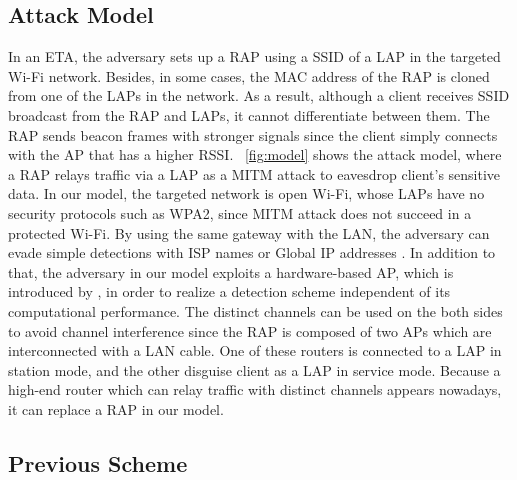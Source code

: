 \documentclass[conference]{IEEEtran}
\begin{document}
\subsection{Attack Model}
In an ETA, the adversary sets up a RAP using a SSID of a LAP in the targeted Wi-Fi network.
Besides, in some cases, the MAC address of the RAP is cloned from one of the LAPs in the network\cite{spoof-evi}.
As a result, although a client receives SSID broadcast from the RAP and LAPs, it cannot differentiate between them.
The RAP sends beacon frames with stronger signals since the client simply connects with the AP that has a higher RSSI.
\figurename~\ref{fig:model} shows the attack model, where a RAP relays traffic via a LAP as a MITM attack to eavesdrop client's sensitive data.
In our model, the targeted network is open Wi-Fi, whose LAPs have no security protocols such as WPA2, since MITM attack does not succeed in a protected Wi-Fi\cite{kataoka}.
By using the same gateway with the LAN, the adversary can evade simple detections with ISP names or Global IP addresses \cite{rtt}.
In addition to that, the adversary in our model exploits a hardware-based AP, which is introduced by \cite{previous}, in order to realize a detection scheme independent of its computational performance.
The distinct channels can be used on the both sides to avoid channel interference since the RAP is composed of two APs which are interconnected with a LAN cable.
One of these routers is connected to a LAP in station mode, and the other disguise client as a LAP in service mode.
Because a high-end router which can relay traffic with distinct channels appears nowadays, it can replace a RAP in our model.

\subsection{Previous Scheme}
\end{document}

